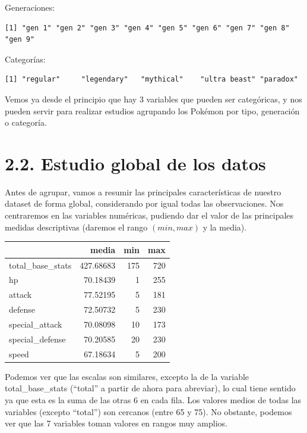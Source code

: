 \documentclass[
  12pt,
]{extreport}
\begin{document}
Generaciones:

\begin{verbatim}
[1] "gen 1" "gen 2" "gen 3" "gen 4" "gen 5" "gen 6" "gen 7" "gen 8" "gen 9"
\end{verbatim}

Categorías:

\begin{verbatim}
[1] "regular"     "legendary"   "mythical"    "ultra beast" "paradox"    
\end{verbatim}

Vemos ya desde el principio que hay 3 variables que pueden ser
categóricas, y nos pueden servir para realizar estudios agrupando los
Pokémon por tipo, generación o categoría.

\section{2.2. Estudio global de los
datos}\label{estudio-global-de-los-datos}

Antes de agrupar, vamos a resumir las principales características de
nuestro dataset de forma global, considerando por igual todas las
observaciones. Nos centraremos en las variables numéricas, pudiendo dar
el valor de las principales medidas descriptivas (daremos el rango
\((min, max)\) y la media).

\begin{table}[H]
\centering
\begin{tabular}{lrrr}
\toprule
  & media & min & max\\
\midrule
total\_base\_stats & 427.68683 & 175 & 720\\
hp & 70.18439 & 1 & 255\\
attack & 77.52195 & 5 & 181\\
defense & 72.50732 & 5 & 230\\
special\_attack & 70.08098 & 10 & 173\\
\addlinespace
special\_defense & 70.20585 & 20 & 230\\
speed & 67.18634 & 5 & 200\\
\bottomrule
\end{tabular}
\end{table}

Podemos ver que las escalas son similares, excepto la de la variable
total\_base\_stats (``total'' a partir de ahora para abreviar), lo cual
tiene sentido ya que esta es la suma de las otras 6 en cada fila. Los
valores medios de todas las variables (excepto ``total'') son cercanos
(entre 65 y 75). No obstante, podemos ver que las 7 variables toman
valores en rangos muy amplios.
\end{document}
